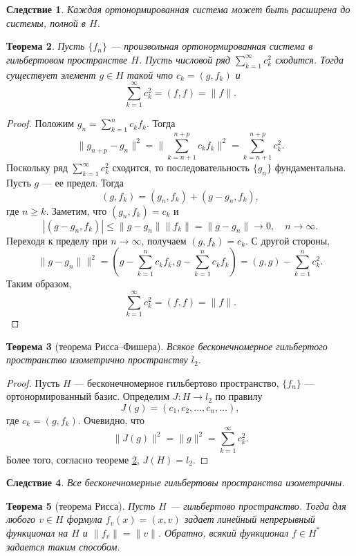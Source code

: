 \documentclass[12pt, titlepage, oneside]{amsbook}
\newtheorem{theorem}{Теорема}[chapter]
\newtheorem{corollary}[theorem]{Следствие}
\theoremstyle{definition}
\theoremstyle{remark}
\begin{document}
\begin{corollary}
\label{Hil4}
Каждая ортонормированная система может быть расширена до системы, полной в $H$.
\end{corollary}

\begin{theorem}
\label{Hil5}
Пусть $\{f_n\}$ --- произвольная ортонормированная система в гильбертовом пространстве $H$. Пусть числовой ряд $\sum\limits_{k=1}^{\infty}c^2_k$ сходится. Тогда существует элемент $g\in H$ такой что $c_k=(g,f_k)$ и $$\sum\limits_{k=1}^{\infty}c^2_k=(f,f)=\|f\|.$$
\end{theorem}

\begin{proof}
Положим $g_n=\sum\limits_{k=1}^{n}c_k f_k$. Тогда $$\|g_{n+p}-g_{n}\|^2=\|\sum\limits_{k=n+1}^{n+p}c_k f_k\|^2=\sum\limits_{k=n+1}^{n+p}c^2_k.$$ Поскольку ряд $\sum\limits_{k=1}^{\infty}c^2_k$ сходится, то последовательность $\{g_n\}$ фундаментальна. Пусть $g$ --- ее предел. Тогда $$(g,f_k)=(g_n,f_k)+(g-g_n,f_k),$$ где $n\geq k$. Заметим, что $(g_n,f_k)=c_k$ и $$|(g-g_n,f_k)|\leq\|g-g_n\|\|f_k\|=\|g-g_n\|\rightarrow 0,\quad n\rightarrow\infty.$$ Переходя к пределу при $n\rightarrow\infty$, получаем $(g,f_k)=c_k$. С другой стороны, $$\|g-g_n\|\|^2=\left(g-\sum\limits_{k=1}^{n}c_k f_k,g-\sum\limits_{k=1}^{n}c_k f_k\right)=(g,g)-\sum\limits_{k=1}^{n}c^2_k.$$ Таким образом, $$\sum\limits_{k=1}^{\infty}c^2_k=(f,f)=\|f\|.$$
\end{proof}

\begin{theorem}[теорема Рисса--Фишера]
\label{RisFish}
Всякое бесконечномерное гильбертого пространство изометрично пространству $l_2$.
\end{theorem}

\begin{proof}
Пусть $H$ --- бесконечномерное гильбертово пространство, $\{f_n\}$ --- ортонормированный базис. Определим $J\colon H\rightarrow l_2$ по правилу $$J(g)=(c_1,c_2,\ldots,c_n,\ldots),$$ где $c_k=(g,f_k)$. Очевидно, что $$\|J(g)\|^2=\|g\|^2=\sum\limits_{k=1}^{\infty}c_k^2.$$ Более того, согласно теореме \ref{Hil5}, $J(H)=l_2$.
\end{proof}

\begin{corollary}
\label{RisFish2}
Все бесконечномерные гильбертовы пространства изометричны.
\end{corollary}

\begin{theorem}[теорема Рисса]
\label{RisHil}
Пусть $H$ --- гильбертово пространство. Тогда для любого $v\in H$ формула $f_v(x)=(x,v)$ задает линейный непрерывный функционал на $H$ и $\|f_v\|=\|v\|$. Обратно, всякий функционал $f\in H^*$ задается таким способом.
\end{theorem}
\end{document}
